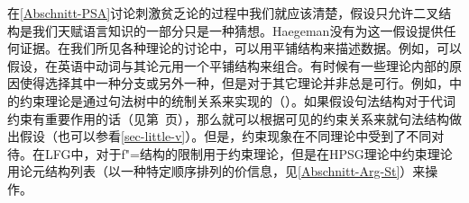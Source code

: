 在\ref{Abschnitt-PSA}讨论刺激贫乏论的过程中我们就应该清楚，假设只允许二叉结构是我们天赋语言知识的一部分只是一种猜想。Haegeman没有为这一假设提供任何证据。在我们所见各种理论的讨论中，可以用平铺结构来描述数据。例如，可以假设，在英语中动词与其论元用一个平铺结构来组合\citep[]{ps2}。有时候有一些理论内部的原因使得选择其中一种分支或另外一种，但是对于其它理论并非总是可行。例如，\gbtc 中的约束理论是通过句法树中的统制关系来实现的（\citep[]{Chomsky81a}）。如果假设句法结构对于代词约束有重要作用的话（见第~\pageref{Seite-Bindungstheorie}页），那么就可以根据可见的约束关系来就句法结构做出假设（也可以参看\ref{sec-little-v}）。但是，约束现象在不同理论中受到了不同对待。在LFG\indexlfgc 中，对于f"=结构的限制用于约束理论\citep{Dalrymple93a}，但是在HPSG\indexhpsgc 理论中约束理论用论元结构列表（以一种特定顺序排列的价信息，见\ref{Abschnitt-Arg-St}）来操作。
 
